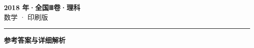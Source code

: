 \documentclass[zihao=5, a4paper]{ctexart}
\begin{document}
\begin{center}
  {\Large\bfseries 2018 年·全国Ⅲ卷·理科}\\[4pt]
  {\large 数学 · 印刷版}
\end{center}
\medskip
{}

\par\bigskip\hrule\bigskip
{}
\begin{center}{\large\bfseries 参考答案与详细解析}\end{center}
\smallskip

\end{document}
